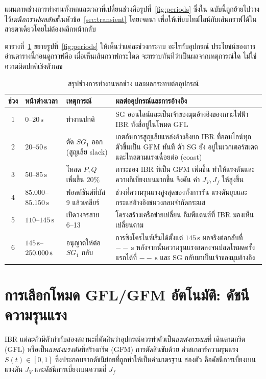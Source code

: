 \documentclass[12pt,a4paper]{article}
\newcommand{\second}{\,\mathrm{s}}
\newcommand{\NewRunReclose}{--}\newcommand{\NewRunFirstRelease}{--}%
\begin{document}
แผนภาพช่วงการทำงานทั้งหกและเวลาที่เปลี่ยนช่วงคือรูปที่~\ref{fig:periods} ซึ่งใน
ฉบับนี้ถูกย้ายไปวางไว้\emph{เหนือกราฟผลลัพธ์}ในหัวข้อ~\ref{sec:transient} โดยเจตนา
เพื่อให้เทียบไทม์ไลน์กับเส้นกราฟได้ในสายตาเดียวโดยไม่ต้องพลิกหน้ากลับ

ตารางที่~\ref{tab:periods} ขยายรูปที่~\ref{fig:periods} ให้เห็นว่าแต่ละช่วงกระทบ
อะไรกับอุปกรณ์ ประโยชน์ของการอ่านตารางนี้ก่อนดูกราฟคือ เมื่อเห็นเส้นกราฟกระโดด
จะทราบทันทีว่าเป็นผลจากเหตุการณ์ใด ไม่ใช่ความผิดปกติเชิงตัวเลข

\begin{table}[H]
\centering\footnotesize
\caption{สรุปช่วงการทำงานหกช่วง และผลกระทบต่ออุปกรณ์}
\label{tab:periods}
\begin{tabularx}{\textwidth}{@{}c l >{\raggedright\arraybackslash}p{} X@{}}
\toprule
ช่วง & หน้าต่างเวลา & เหตุการณ์ & ผลต่ออุปกรณ์และการอ้างอิง \\ \midrule
1 & $0$--$20\second$ & ทำงานปกติ &
SG ออนไลน์และเป็นเจ้าของมุมอ้างอิงของเกาะไฟฟ้า IBR ทั้งสี่อยู่ในโหมด GFL \\
2 & $20$--$50\second$ & ตัด $SG_1$ ออก (สูญเสีย slack) &
เกตกันการสูญเสียแหล่งอ้างอิงยก IBR ที่ออนไลน์ทุกตัวขึ้นเป็น GFM ทันที ตัว SG ยัง
อยู่ในเวกเตอร์สเตตและไหลตามแรงเฉื่อยต่อ (coast) \\
3 & $50$--$85\second$ & โหลด $P,Q$ เพิ่มขึ้น $20\%$ &
ภาระของ IBR ที่เป็น GFM เพิ่มขึ้น ทำให้แรงดันและความถี่เบี่ยงเบนมากขึ้น จึงดัน
ค่า $J_V,J_f$ ให้สูงขึ้น \\
4 & $85.000$--$85.150\second$ & ฟอลต์ชันต์ที่บัส 9 แล้วเคลียร์ &
ช่วงที่ความรุนแรงสูงสุดของทั้งการรัน แรงดันยุบและกระแสอ้างอิงชนวงกลมจำกัดกระแส \\
5 & $110$--$145\second$ & เปิดวงจรสาย 6--13 &
โครงสร้างเครือข่ายเปลี่ยน อิมพีแดนซ์ที่ IBR มองเห็นเปลี่ยนตาม \\
6 & $145\second$--$\NewRunEnd\second$ & อนุญาตให้ต่อ $SG_1$ กลับ &
การซิงโครไนซ์เริ่มได้ตั้งแต่ $145\second$ ผลจริงต่อกลับที่ $\NewRunReclose\second$
หลังจากนั้นความรุนแรงลดลงจนปลดโหมดครั้งแรกได้ที่
$\NewRunFirstRelease\second$ และ SG กลับมาเป็นเจ้าของมุมอ้างอิง \\
\bottomrule
\end{tabularx}
\end{table}
\newpage
\section{การเลือกโหมด GFL/GFM อัตโนมัติ: ดัชนีความรุนแรง}\label{sec:sev}
IBR แต่ละตัวมีตัวกำกับสองสถานะที่ตัดสินว่าอุปกรณ์ควรทำตัวเป็น\emph{แหล่งกระแส}ที่
เดินตามกริด (GFL) หรือเป็น\emph{แหล่งแรงดัน}ที่สร้างกริด (GFM) การตัดสินขับด้วย
ค่าสเกลาร์ความรุนแรง $S(t)\in[0,1]$ ซึ่งประกอบจากดัชนีย่อยที่ถูกทำให้เป็นค่ามาตรฐาน
สองตัว คือดัชนีการเบี่ยงเบนแรงดัน $J_V$ และดัชนีการเบี่ยงเบนความถี่ $J_f$
\end{document}
